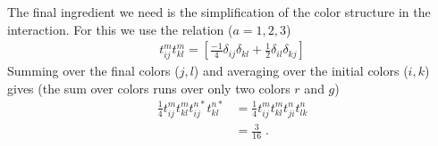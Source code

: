 \documentclass[10pt, aps, prd, superscriptaddress, nofootinbib, 
               amsmath, amssymb, twocolumn,
               preprintnumbers, showpacs,
               raggedbottom,
               floatfix]{revtex4-1}
\begin{document}
The final ingredient we need is the simplification of the color structure in
the interaction. For this we use the relation ($a=1,2,3$)
\begin{equation}
\begin{split}
t^m_{ij} t^m_{kl} = [\frac{-1}{4}\delta_{ij}\delta_{kl} + \frac{1}{2}\delta_{il}\delta_{kj}]
\end{split}
\end{equation}
Summing over the final colors ($j,l$) and averaging over the initial colors
($i,k$) gives (the sum over colors runs over only two
colors $r$ and $g$)
\begin{equation}
\begin{split}
\frac{1}{4} t^m_{ij} t^m_{kl} t^{n*}_{ij} t^{n*}_{kl} &= 
\frac{1}{4} t^m_{ij} t^m_{kl} t^{n}_{ji} t^{n}_{lk}\\
&=\frac{3}{16}\;.
\end{split}
\end{equation}
\end{document}
